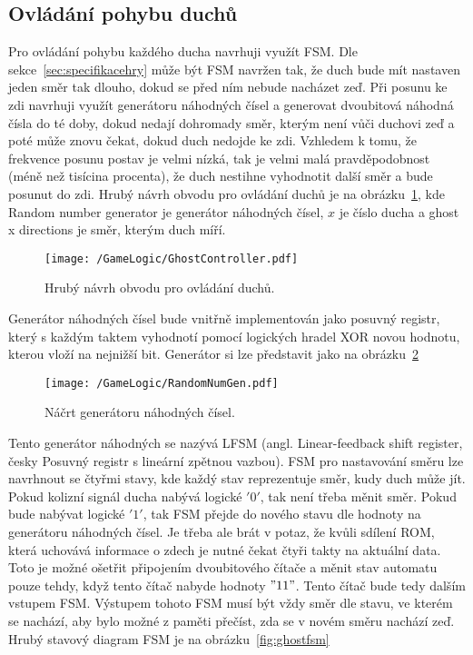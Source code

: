 \documentclass{report}
\begin{document}
\subsection{Ovládání pohybu duchů}\label{sec:pohybduchu}
Pro ovládání pohybu každého ducha navrhuji využít FSM. Dle sekce~\ref{sec:specifikacehry} může být FSM navržen tak, že duch bude mít nastaven jeden směr tak dlouho, dokud se před ním nebude nacházet zeď. Při posunu ke zdi navrhuji využít generátoru náhodných čísel a generovat dvoubitová náhodná čísla do té doby, dokud nedají dohromady směr, kterým není vůči duchovi zeď a poté může znovu čekat, dokud duch nedojde ke zdi. Vzhledem k tomu, že frekvence posunu postav je velmi nízká, tak je velmi malá pravděpodobnost (méně než tisícina procenta), že duch nestihne vyhodnotit další směr a bude posunut do zdi. Hrubý návrh obvodu pro ovládání duchů je na obrázku~\ref{fig:ghostcontrol}, kde Random number generator je generátor náhodných čísel, $x$ je číslo ducha a ghost x directions je směr, kterým duch míří.
\begin{figure}
\centering
\texttt{[image: /GameLogic/GhostController.pdf]}
\caption{Hrubý návrh obvodu pro ovládání duchů.}
\label{fig:ghostcontrol}
\end{figure}
Generátor náhodných čísel bude vnitřně implementován jako posuvný registr, který s každým taktem vyhodnotí pomocí logických hradel XOR novou hodnotu, kterou vloží na nejnižší bit. Generátor si lze představit jako na obrázku~\ref{fig:randomnum}~\cite{shiftregisters}
\begin{figure}
\centering
\texttt{[image: /GameLogic/RandomNumGen.pdf]}
\caption{Náčrt generátoru náhodných čísel.}
\label{fig:randomnum}
\end{figure}
Tento generátor náhodných se nazývá LFSM (angl. Linear-feedback shift register, česky Posuvný registr s lineární zpětnou vazbou). FSM pro nastavování směru lze navrhnout se čtyřmi stavy, kde každý stav reprezentuje směr, kudy duch může jít. Pokud kolizní signál ducha nabývá logické $'0'$, tak není třeba měnit směr. Pokud bude nabývat logické $'1'$, tak FSM přejde do nového stavu dle hodnoty na generátoru náhodných čísel. Je třeba ale brát v potaz, že kvůli sdílení ROM, která uchovává informace o zdech je nutné čekat čtyři takty na aktuální data. Toto je možné ošetřit připojením dvoubitového čítače a měnit stav automatu pouze tehdy, když tento čítač nabyde hodnoty $"11"$. Tento čítač bude tedy dalším vstupem FSM. Výstupem tohoto FSM musí být vždy směr dle stavu, ve kterém se nachází, aby bylo možné z paměti přečíst, zda se v novém směru nachází zeď. Hrubý stavový diagram FSM je na obrázku~\ref{fig:ghostfsm}
\end{document}
